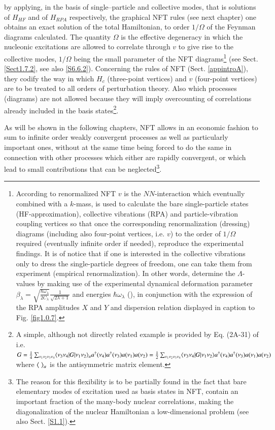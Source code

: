 by applying,  in the basis of single--particle and collective modes, that is solutions of $H_{HF}$ and of $H_{RPA}$ respectively, the graphical  NFT rules  (see next chapter) one obtains an exact solution of the total Hamiltonian, to order $1/\Omega$ of the Feynman diagrams calculated. The quantity $\Omega$ is the effective degeneracy in which the nucleonic excitations are allowed to correlate through $v$ to give rise to the collective modes, $1/\Omega$ being the small parameter of the NFT diagrams\footnote{According to renormalized NFT $v$ is the $NN$-interaction which eventually combined with a $k$-mass, is used to calculate the bare single-particle states (HF-approximation), collective vibrations (RPA) and particle-vibration coupling vertices so that once the corresponding renormalization (dressing) diagrams (including also four-point vertices, i.e. $v$) to the order of $1/\Omega$ required (eventually infinite order if needed), reproduce the experimental findings. It is of notice that if one is interested in the collective vibrations only to dress the single-particle degrees of freedom, one can take them from experiment (empirical renormalization). In other words, determine the $\Lambda$-values by making use of the experimental dynamical deformation parameter $\beta_\lambda=\sqrt{\frac{\hbar\omega_\lambda}{2C_\lambda}}\frac{1}{\sqrt{2\lambda+1}}$ and energies $\hbar\omega_\lambda$ (\cite{Broglia:16}), in conjunction with the expression of the RPA amplitudes $X$ and $Y$ and dispersion relation displayed in caption to Fig. \ref{fig1.0.7}.} (see Sect. \ref{Sect1.7.2}, see also \ref{S6.6.2}). Concerning the rules of NFT (Sect. \ref{appintroA}), they codify the way in which $H_c$ (three-point vertices) and $v$ (four-point vertices) are to be treated to all orders of perturbation theory. Also which processes (diagrams) are not allowed because they will imply overcounting of correlations already included in the basis states\footnote{A simple, although not directly related example is provided by Eq. (2A-31) of \cite{Bohr:69} i.e. $G=\tfrac{1}{4}\sum_{\nu_1\nu_2\nu_3\nu_4}\langle {\nu_3\nu_4|G|\nu_1\nu_2} \rangle_ aa^\dagger(\nu_4)a^\dagger(\nu_3)a(\nu_1)a(\nu_2)=\tfrac{1}{2}\sum_{\nu_1\nu_2\nu_3\nu_4}\langle {\nu_3\nu_4|G|\nu_1\nu_2} \rangle a^\dagger(\nu_4)a^\dagger(\nu_3)a(\nu_1)a(\nu_2)$ where $\langle {\;} \rangle_a$ is the antisymmetric matrix element.}. 

As will be shown in the following chapters, NFT allows in an economic fashion to sum to infinite order weakly convergent processes as well as particularly important ones, without at the same time being forced to do the same in connection with other processes which either are rapidly convergent, or which lead to small contributions that can be neglected\footnote{The reason for this flexibility is to be partially found in the fact that bare elementary modes of excitation used as basis states in NFT, contain an important fraction of the many-body nuclear correlations, making the diagonalization of the nuclear Hamiltonian a low-dimensional problem (see also Sect. \ref{S1.1}).}.


